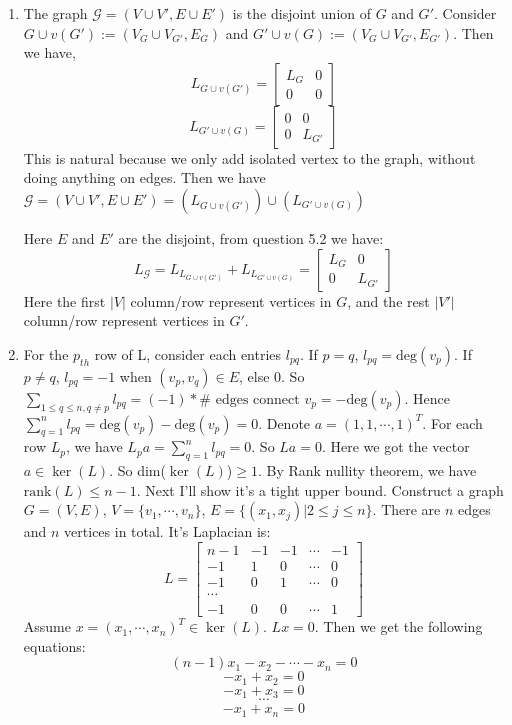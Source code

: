 \documentclass[twoside,11pt]{homework}
\begin{document}
\begin{enumerate}
    \item
    The graph $\mathcal{G}=(V\cup V',E\cup E')$ is the disjoint union of $G$ and $G'$. Consider $G \cup v(G') := (V_G \cup V_{G'}, E_G)$ and $G' \cup v(G) := (V_G \cup V_{G'}, E_{G'})$. Then we have,
    $$L_{G \cup v(G')}=
    \left[
    \begin{matrix}
    L_G &0\\
    0&0
    \end{matrix}
    \right]$$
    $$L_{G' \cup v(G)}=
    \left[
    \begin{matrix}
    0 &0\\
    0&L_{G'}
    \end{matrix}
    \right]$$
    This is natural because we only add isolated vertex to the graph, without doing anything on edges. Then we have $\mathcal{G}=(V\cup V',E\cup E') = (L_{G \cup v(G')})\cup (L_{G' \cup v(G)})$
    
    Here $E$ and $E'$ are the disjoint, from question 5.2 we have:
    $$L_\mathcal{G} =L_{L_{G \cup v(G')}} + L_{L_{G' \cup v(G)}} = 
    \left[
    \begin{matrix}
    L_G &0\\
    0&L_{G'}
    \end{matrix}
    \right]$$
    Here the first $|V|$ column/row represent vertices in $G$, and the rest $|V'|$ column/row represent vertices in $G'$.
    \item
    For the $p_{th}$ row of L, consider each entries $l_{pq}$.
    If $p =q$, $l_{pq}=\text{deg}(v_p).$
    If $p \neq q$, $l_{pq} =-1$ when $(v_p,v_q)\in E$, else 0. So $\sum_{1 \leq q \leq n, q \neq p} l_{pq} = (-1) * \# \text{ edges connect }v_p = -\text{deg}(v_p)$. Hence $\sum_{q=1}^n l_{pq} = \text{deg}(v_p)-\text{deg}(v_p)=0$. 
    Denote $a=(1,1,\cdots,1)^T$.
    For each row $L_p$, we have $L_p a=\sum_{q=1}^n l_{pq}=0$. So $La=0$.\newline\newline
    Here we got the vector $a \in \ker(L)$. So dim($\ker (L)$)$\geq 1$. By Rank nullity theorem, we have $\text{rank} (L) \leq n-1$. Next I'll show it's a tight upper bound.\newline\newline
    Construct a graph $G=(V,E)$, $V = \{v_1, \cdots,v_n\}$, $E = \{(x_1,x_j)|2 \leq j \leq n\}$. There are $n$ edges and $n$ vertices in total. It's Laplacian is:
    $$L=\left[
    \begin{matrix}
    n-1 & -1 & -1 & \cdots & -1\\
    -1& 1  & 0  & \cdots  &0\\
    -1&0&1&\cdots &0\\
    \cdots\\
    -1&0&0&\cdots &1
    \end{matrix}
    \right]$$
    Assume $x = (x_1, \cdots, x_n)^T \in \ker (L)$. $Lx=0$. Then we get the following equations:
    $$(n-1) x_1-x_2-\cdots -x_n=0$$
    $$-x_1+x_2=0$$
    $$-x_1+x_3=0$$
    $$\cdots$$
    $$-x_1+x_n=0$$
    

\end{enumerate}
\end{document}
